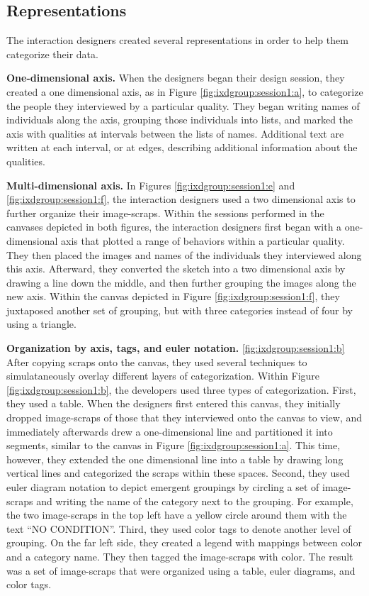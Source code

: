 \subsection{Representations}

The interaction designers created several representations in order to help them categorize their data. 

\textbf{One-dimensional axis.} When the designers began their design session, they created a one dimensional axis, as in Figure \ref{fig:ixdgroup:session1:a}, to categorize the people they interviewed by a particular quality. They began writing names of individuals along the axis, grouping those individuals into lists, and marked the axis with qualities at intervals between the lists of names. Additional text are written at each interval, or at edges, describing additional information about the qualities.

\textbf{Multi-dimensional axis.} In Figures \ref{fig:ixdgroup:session1:e} and \ref{fig:ixdgroup:session1:f}, the interaction designers used a two dimensional axis to further organize their image-scraps. Within the sessions performed in the canvases depicted in both figures, the interaction designers first began with a one-dimensional axis that plotted a range of behaviors within a particular quality. They then placed the images and names of the individuals they interviewed along this axis. Afterward, they converted the sketch into a two dimensional axis by drawing a line down the middle, and then further grouping the images along the new axis. Within the canvas depicted in Figure \ref{fig:ixdgroup:session1:f}, they juxtaposed another set of grouping, but with three categories instead of four by using a triangle.

\textbf{Organization by axis, tags, and euler notation.} \ref{fig:ixdgroup:session1:b} After copying scraps onto the canvas, they used several techniques to simulataneously overlay  different layers of categorization. Within Figure \ref{fig:ixdgroup:session1:b}, the developers used three types of categorization. First, they used a table. When the designers first entered this canvas, they initially dropped image-scraps of those that they interviewed onto the canvas to view, and immediately afterwards drew a one-dimensional line and partitioned it into segments, similar to the canvas in Figure \ref{fig:ixdgroup:session1:a}. This time, however, they extended the one dimensional line into a table by drawing long vertical lines and categorized the scraps within these spaces. Second, they used euler diagram notation to depict emergent groupings by circling a set of image-scraps and writing the name of the category next to the grouping. For example, the two image-scraps in the top left have a yellow circle around them with the text ``NO CONDITION''. Third, they used color tags to denote another level of grouping. On the far left side, they created a legend with mappings between color and a category name. They then tagged the image-scraps with color. The result was a set of image-scraps that were organized using a table, euler diagrams, and color tags.

